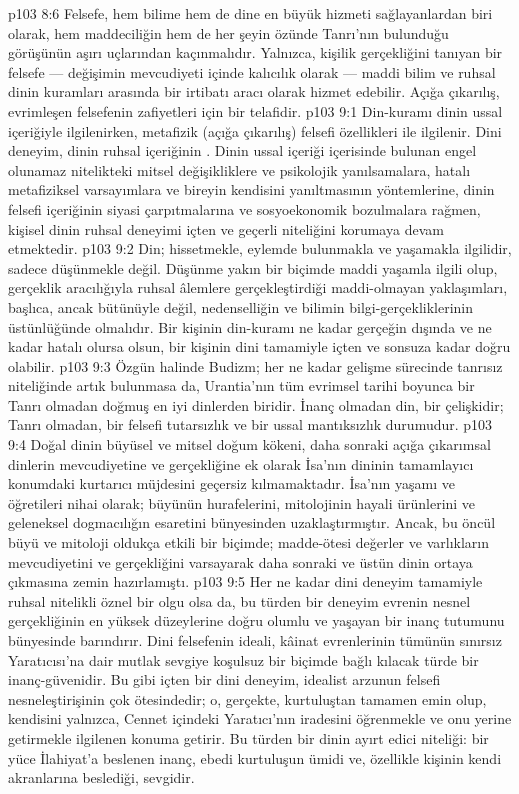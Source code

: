 \vs p103 8:6 Felsefe, hem bilime hem de dine en büyük hizmeti sağlayanlardan biri olarak, hem maddeciliğin hem de her şeyin özünde Tanrı’nın bulunduğu görüşünün aşırı uçlarından kaçınmalıdır. Yalnızca, kişilik gerçekliğini tanıyan bir felsefe --- değişimin mevcudiyeti içinde kalıcılık olarak --- maddi bilim ve ruhsal dinin kuramları arasında bir irtibatı aracı olarak hizmet edebilir. Açığa çıkarılış, evrimleşen felsefenin zafiyetleri için bir telafidir.
\vs p103 9:1 Din\hyp{}kuramı dinin ussal içeriğiyle ilgilenirken, metafizik (açığa çıkarılış) felsefi özellikleri ile ilgilenir. Dini deneyim, dinin ruhsal içeriğinin . Dinin ussal içeriği içerisinde bulunan engel olunamaz nitelikteki mitsel değişikliklere ve psikolojik yanılsamalara, hatalı metafiziksel varsayımlara ve bireyin kendisini yanıltmasının yöntemlerine, dinin felsefi içeriğinin siyasi çarpıtmalarına ve sosyoekonomik bozulmalara rağmen, kişisel dinin ruhsal deneyimi içten ve geçerli niteliğini korumaya devam etmektedir.
\vs p103 9:2 Din; hissetmekle, eylemde bulunmakla ve yaşamakla ilgilidir, sadece düşünmekle değil. Düşünme yakın bir biçimde maddi yaşamla ilgili olup, gerçeklik aracılığıyla ruhsal âlemlere gerçekleştirdiği maddi\hyp{}olmayan yaklaşımları, başlıca, ancak bütünüyle değil, nedenselliğin ve bilimin bilgi\hyp{}gerçekliklerinin üstünlüğünde olmalıdır. Bir kişinin din\hyp{}kuramı ne kadar gerçeğin dışında ve ne kadar hatalı olursa olsun, bir kişinin dini tamamiyle içten ve sonsuza kadar doğru olabilir.
\vs p103 9:3 Özgün halinde Budizm; her ne kadar gelişme sürecinde tanrısız niteliğinde artık bulunmasa da, Urantia’nın tüm evrimsel tarihi boyunca bir Tanrı olmadan doğmuş en iyi dinlerden biridir. İnanç olmadan din, bir çelişkidir; Tanrı olmadan, bir felsefi tutarsızlık ve bir ussal mantıksızlık durumudur.
\vs p103 9:4 Doğal dinin büyüsel ve mitsel doğum kökeni, daha sonraki açığa çıkarımsal dinlerin mevcudiyetine ve gerçekliğine ek olarak İsa’nın dininin tamamlayıcı konumdaki kurtarıcı müjdesini geçersiz kılmamaktadır. İsa’nın yaşamı ve öğretileri nihai olarak; büyünün hurafelerini, mitolojinin hayali ürünlerini ve geleneksel dogmacılığın esaretini bünyesinden uzaklaştırmıştır. Ancak, bu öncül büyü ve mitoloji oldukça etkili bir biçimde; madde\hyp{}ötesi değerler ve varlıkların mevcudiyetini ve gerçekliğini varsayarak daha sonraki ve üstün dinin ortaya çıkmasına zemin hazırlamıştı.
\vs p103 9:5 Her ne kadar dini deneyim tamamiyle ruhsal nitelikli öznel bir olgu olsa da, bu türden bir deneyim evrenin nesnel gerçekliğinin en yüksek düzeylerine doğru olumlu ve yaşayan bir inanç tutumunu bünyesinde barındırır. Dini felsefenin ideali, kâinat evrenlerinin tümünün sınırsız Yaratıcısı’na dair mutlak sevgiye koşulsuz bir biçimde bağlı kılacak türde bir inanç\hyp{}güvenidir. Bu gibi içten bir dini deneyim, idealist arzunun felsefi nesneleştirişinin çok ötesindedir; o, gerçekte, kurtuluştan tamamen emin olup, kendisini yalnızca, Cennet içindeki Yaratıcı’nın iradesini öğrenmekle ve onu yerine getirmekle ilgilenen konuma getirir. Bu türden bir dinin ayırt edici niteliği: bir yüce İlahiyat’a beslenen inanç, ebedi kurtuluşun ümidi ve, özellikle kişinin kendi akranlarına beslediği, sevgidir.
